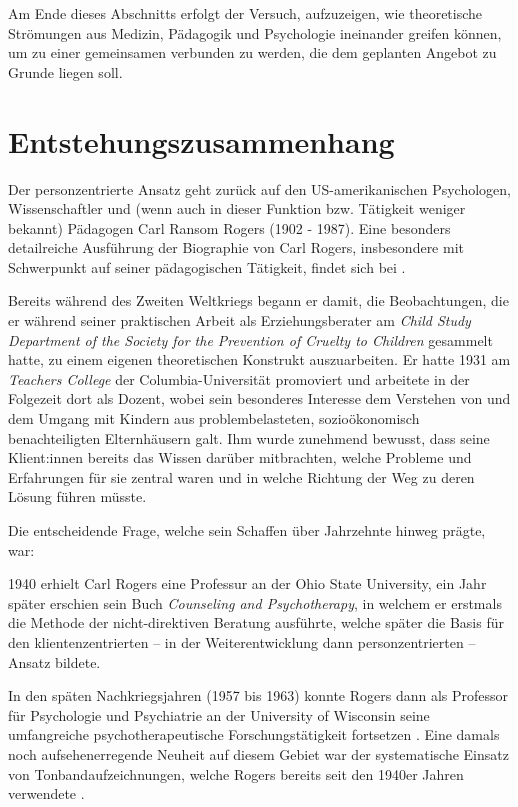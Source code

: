\documentclass[
  twoside,
  parskip=half-,
  paper=176mm:246mm,
  BCOR=14mm,
  DIV=14,
]{scrreprt}
\begin{document}
Am Ende dieses Abschnitts erfolgt der Versuch, aufzuzeigen, wie theoretische Strömungen aus Medizin, Pädagogik und Psychologie ineinander greifen können, um zu einer gemeinsamen  verbunden zu werden, die dem geplanten Angebot zu Grunde liegen soll.

\section{Entstehungszusammenhang}

Der personzentrierte Ansatz geht zurück auf den US-amerikanischen Psychologen, Wissenschaftler und (wenn auch in dieser Funktion bzw. Tätigkeit weniger bekannt) Pädagogen Carl Ransom Rogers (1902 - 1987). Eine besonders detailreiche Ausführung der Biographie von Carl Rogers, insbesondere mit Schwerpunkt auf seiner pädagogischen Tätigkeit, findet sich bei \textcite[vgl.][Kap. 3]{kunze}. 

Bereits während des Zweiten Weltkriegs begann er damit, die Beobachtungen, die er während seiner praktischen Arbeit als Erziehungsberater am \textit{Child Study Department of the Society for the Prevention of Cruelty to Children} gesammelt hatte, zu einem eigenen theoretischen Konstrukt auszuarbeiten. Er hatte 1931 am \textit{Teachers College} der Columbia-Universität promoviert und arbeitete in der Folgezeit dort als Dozent, wobei sein besonderes Interesse dem Verstehen von und dem Umgang mit Kindern aus problembelasteten, sozioökonomisch benachteiligten Elternhäusern galt. Ihm wurde zunehmend bewusst, dass seine Klient:innen bereits das Wissen darüber mitbrachten, welche Probleme und Erfahrungen für sie zentral waren und in welche Richtung der Weg zu deren Lösung führen müsste. 

Die entscheidende Frage, welche sein Schaffen über Jahrzehnte hinweg prägte, war: 

1940 erhielt Carl Rogers eine Professur an der Ohio State University, ein Jahr später erschien sein Buch \textit{Counseling and Psychotherapy}, in welchem er erstmals die Methode der nicht-direktiven Beratung ausführte, welche später die Basis für den klientenzentrierten -- in der Weiterentwicklung dann personzentrierten -- Ansatz bildete.

In den späten Nachkriegsjahren (1957 bis 1963) konnte Rogers dann als Professor für Psychologie und Psychiatrie an der University of Wisconsin seine umfangreiche psychotherapeutische Forschungstätigkeit fortsetzen \autocite[vgl.][Kap. 5.2.1]{kunze}. Eine damals noch aufsehenerregende Neuheit auf diesem Gebiet war der systematische Einsatz von Tonbandaufzeichnungen, welche Rogers bereits seit den 1940er Jahren verwendete \autocite[239]{kunze}.
\end{document}
